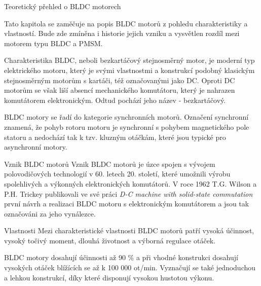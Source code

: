 
\chap Teoretický přehled o BLDC motorech

Tato kapitola se zaměčuje na popis BLDC motorů z pohledu charakteristiky a vlastností. Bude zde zmíněna i historie jejich vzniku
a vysvětlen rozdíl mezi motorem typu BLDC a PMSM.

\sec Charakteristika
BLDC, neboli bezkartáčový stejnosměrný motor, je moderní
typ elektrického motoru, který je svými vlastnostmi a konstrukcí podobný klasickým stejnosměrným motorům s kartáči, též označovanými jako DC.
Oproti DC motorům se však liší absencí mechanického komutátoru, který je nahrazen komutátorem elektronickým. Odtud pochází 
jeho název - bezkartáčový. 

BLDC motory se řadí do kategorie synchronních motorů. Označení synchronní znamená, že pohyb rotoru motoru je synchronní s
pohybem magnetického pole statoru a nedochází tak k tzv. kluzným otáčkám, které jsou typické pro asynchronní motory. 


\secc Vznik BLDC motorů
Vznik BLDC motorů je úzce spojen s vývojem polovodičových technologií v 60. letech 20. století, které 
umožnili výrobu spolehlivých a výkonných elektronických komutátorů. V roce 1962 T.G. Wilson a P.H. Trickey publikovali
ve své práci \textit{D-C machine with solid-state commutation} první návrh a realizaci BLDC motoru s elektronickým komutátorem
a jsou tak označováni za jeho vynálezce.

\secc Vlastnosti
Mezi charakteristické vlastnosti BLDC motorů patří vysoká účinnost, vysoký točivý moment, dlouhá životnost a výborná regulace otáček.

BLDC motory dosahují účinnosti až 90 \% a při vhodné konstrukci dosahují vysokých otáček blížících se až k 100 000 ot/min. %
Vyznačují se také jednoduchou a lehkou konstrukcí, díky které disponují vysokou hustotou výkonu. 

